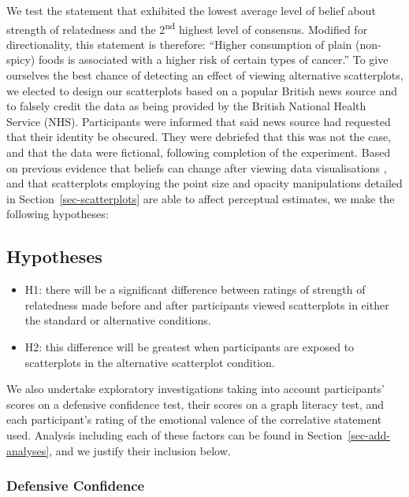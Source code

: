 \documentclass[sigconf]{acmart}
\providecommand{\tightlist}{%
  \setlength{\itemsep}{0pt}\setlength{\parskip}{0pt}}\usepackage{longtable,booktabs,array}
\begin{document}
We test the statement that exhibited the lowest average level of belief
about strength of relatedness and the 2\textsuperscript{nd} highest
level of consensus. Modified for directionality, this statement is
therefore: ``Higher consumption of plain (non-spicy) foods is associated
with a higher risk of certain types of cancer.'' To give ourselves the
best chance of detecting an effect of viewing alternative scatterplots,
we elected to design our scatterplots based on a popular British news
source and to falsely credit the data as being provided by the British
National Health Service (NHS). Participants were informed that said news
source had requested that their identity be obscured. They were
debriefed that this was not the case, and that the data were fictional,
following completion of the experiment. Based on previous evidence that
beliefs can change after viewing data visualisations
\citep{karduni_2020, markant_2023}, and that scatterplots employing the
point size and opacity manipulations detailed in
Section~\ref{sec-scatterplots} are able to affect perceptual estimates,
we make the following hypotheses:

\subsection{Hypotheses}\label{hypotheses}

\begin{itemize}
\tightlist
\item
  H1: there will be a significant difference between ratings of strength
  of relatedness made before and after participants viewed scatterplots
  in either the standard or alternative conditions.
\item
  H2: this difference will be greatest when participants are exposed to
  scatterplots in the alternative scatterplot condition.
\end{itemize}

We also undertake exploratory investigations taking into account
participants' scores on a defensive confidence test, their scores on a
graph literacy test, and each participant's rating of the emotional
valence of the correlative statement used. Analysis including each of
these factors can be found in Section~\ref{sec-add-analyses}, and we
justify their inclusion below.

\subsubsection{Defensive Confidence}\label{sec-def-con}
\end{document}
